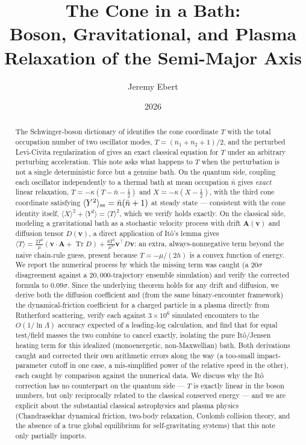 \documentclass[12pt]{amsart}
\title[Baths on the AM--GM Cone]{The Cone in a Bath:\\
Boson, Gravitational, and Plasma Relaxation of the Semi-Major Axis}
\author{Jeremy Ebert}
\date{2026}
\theoremstyle{plain}
\theoremstyle{remark}
\begin{document}
\maketitle

\begin{abstract}
The Schwinger-boson dictionary of \cite{Ebert2026Quantum} identifies the cone coordinate $T$ with the total occupation number of two oscillator modes, $T=(n_1+n_2+1)/2$, and the perturbed Levi-Civita regularization of \cite{Ebert2026LeviCivita} gives an exact classical equation for $\dot T$ under an arbitrary perturbing acceleration. This note asks what happens to $T$ when the perturbation is not a single deterministic force but a genuine bath. On the quantum side, coupling each oscillator independently to a thermal bath at mean occupation $\bar n$ gives \emph{exact} linear relaxation, $\dot T=-\kappa(T-\bar n-\tfrac12)$ and $\dot X=-\kappa(X-\tfrac12)$, with the third cone coordinate satisfying $\langle Y^2\rangle_{\rm ss}=\bar n(\bar n+1)$ at steady state --- consistent with the cone identity itself, $\langle X\rangle^2+\langle Y^2\rangle=\langle T\rangle^2$, which we verify holds exactly. On the classical side, modeling a gravitational bath as a stochastic velocity process with drift $\mathbf A(\mathbf v)$ and diffusion tensor $D(\mathbf v)$, a direct application of It\^o's lemma gives $\langle\dot T\rangle=\frac{2T^2}{\mu}(\mathbf v\cdot\mathbf A+\operatorname{Tr}D)+\frac{8T^3}{\mu^2}\mathbf v^\top D\mathbf v$: an extra, always-nonnegative term beyond the naive chain-rule guess, present because $T=-\mu/(2h)$ is a convex function of energy. We report the numerical process by which the missing term was caught (a $20\sigma$ disagreement against a $20{,}000$-trajectory ensemble simulation) and verify the corrected formula to $0.09\sigma$. Since the underlying theorem holds for any drift and diffusion, we derive both the diffusion coefficient and (from the same binary-encounter framework) the dynamical-friction coefficient for a charged particle in a plasma directly from Rutherford scattering, verify each against $3\times10^6$ simulated encounters to the $O(1/\ln\Lambda)$ accuracy expected of a leading-log calculation, and find that for equal test/field masses the two combine to cancel exactly, isolating the pure It\^o/Jensen heating term for this idealized (monoenergetic, non-Maxwellian) bath. Both derivations caught and corrected their own arithmetic errors along the way (a too-small impact-parameter cutoff in one case, a mis-simplified power of the relative speed in the other), each caught by comparison against the numerical data. We discuss why the It\^o correction has no counterpart on the quantum side --- $T$ is exactly linear in the boson numbers, but only reciprocally related to the classical conserved energy --- and we are explicit about the substantial classical astrophysics and plasma physics (Chandrasekhar dynamical friction, two-body relaxation, Coulomb collision theory, and the absence of a true global equilibrium for self-gravitating systems) that this note only partially imports.
\end{abstract}
\end{document}
